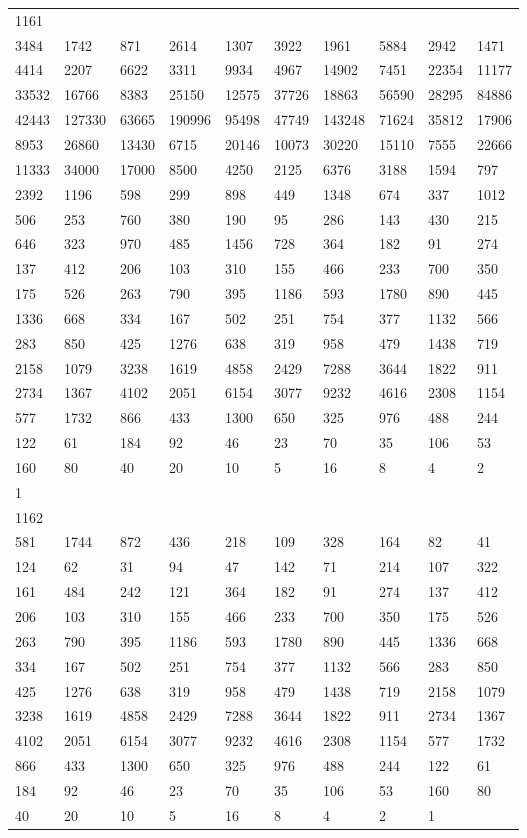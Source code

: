 \begin{longtable}{*{10}{l}}
1161&&&&&&&&&\\
3484& 1742& 871& 2614& 1307& 3922& 1961& 5884& 2942& 1471\\
4414& 2207& 6622& 3311& 9934& 4967& 14902& 7451& 22354& 11177\\
33532& 16766& 8383& 25150& 12575& 37726& 18863& 56590& 28295& 84886\\
42443& 127330& 63665& 190996& 95498& 47749& 143248& 71624& 35812& 17906\\
8953& 26860& 13430& 6715& 20146& 10073& 30220& 15110& 7555& 22666\\
11333& 34000& 17000& 8500& 4250& 2125& 6376& 3188& 1594& 797\\
2392& 1196& 598& 299& 898& 449& 1348& 674& 337& 1012\\
506& 253& 760& 380& 190& 95& 286& 143& 430& 215\\
646& 323& 970& 485& 1456& 728& 364& 182& 91& 274\\
137& 412& 206& 103& 310& 155& 466& 233& 700& 350\\
175& 526& 263& 790& 395& 1186& 593& 1780& 890& 445\\
1336& 668& 334& 167& 502& 251& 754& 377& 1132& 566\\
283& 850& 425& 1276& 638& 319& 958& 479& 1438& 719\\
2158& 1079& 3238& 1619& 4858& 2429& 7288& 3644& 1822& 911\\
2734& 1367& 4102& 2051& 6154& 3077& 9232& 4616& 2308& 1154\\
577& 1732& 866& 433& 1300& 650& 325& 976& 488& 244\\
122& 61& 184& 92& 46& 23& 70& 35& 106& 53\\
160& 80& 40& 20& 10& 5& 16& 8& 4& 2\\
1& \\

1162&&&&&&&&&\\
581& 1744& 872& 436& 218& 109& 328& 164& 82& 41\\
124& 62& 31& 94& 47& 142& 71& 214& 107& 322\\
161& 484& 242& 121& 364& 182& 91& 274& 137& 412\\
206& 103& 310& 155& 466& 233& 700& 350& 175& 526\\
263& 790& 395& 1186& 593& 1780& 890& 445& 1336& 668\\
334& 167& 502& 251& 754& 377& 1132& 566& 283& 850\\
425& 1276& 638& 319& 958& 479& 1438& 719& 2158& 1079\\
3238& 1619& 4858& 2429& 7288& 3644& 1822& 911& 2734& 1367\\
4102& 2051& 6154& 3077& 9232& 4616& 2308& 1154& 577& 1732\\
866& 433& 1300& 650& 325& 976& 488& 244& 122& 61\\
184& 92& 46& 23& 70& 35& 106& 53& 160& 80\\
40& 20& 10& 5& 16& 8& 4& 2& 1& \\


\end{longtable}
